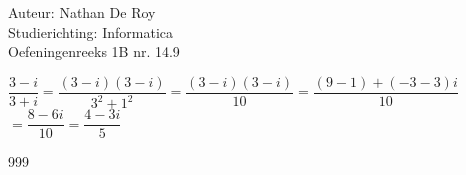 \documentclass[a4paper]{article}
\begin{document}
  
\noindent \large Auteur: Nathan De Roy \\
\noindent \large Studierichting: Informatica\\
\noindent \large Oefeningenreeks 1B nr. 14.9\\

\medskip

\normalsize

$\dfrac{3 - i}{3 + i} = \dfrac{(3 - i)(3 - i)}{3^2 + 1^2} = \dfrac{(3 - i)(3 - i)}{10} = \dfrac{(9 - 1) + (-3 - 3)i}{10}$\\

$= \dfrac{8 -6i}{10} = \dfrac{4 -3i}{5}$\\

\begin{thebibliography}{999}
\end{thebibliography}
\end{document}

